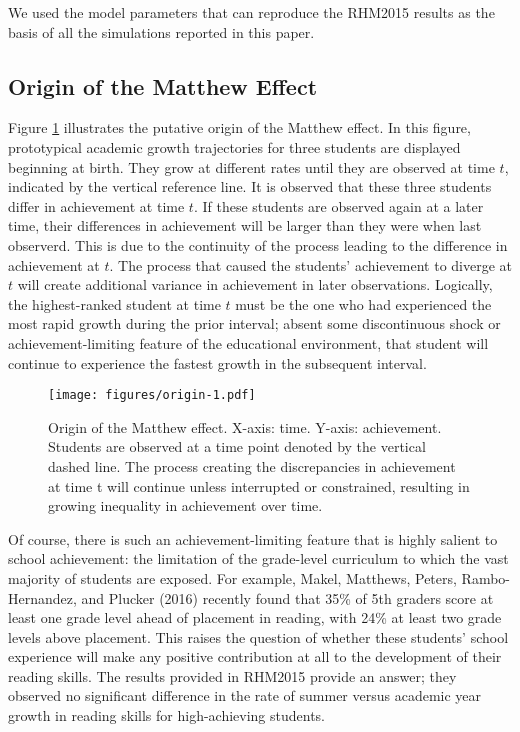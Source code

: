 \documentclass[english,floatsintext,jou]{apa6}
\theoremstyle{definition}
\theoremstyle{definition}
\theoremstyle{definition}
\theoremstyle{remark}
\begin{document}
We used the model parameters that can reproduce the RHM2015 results as
the basis of all the simulations reported in this paper.

\subsection{Origin of the Matthew
Effect}\label{origin-of-the-matthew-effect}

Figure \ref{fig:origin} illustrates the putative origin of the Matthew
effect. In this figure, prototypical academic growth trajectories for
three students are displayed beginning at birth. They grow at different
rates until they are observed at time \(t\), indicated by the vertical
reference line. It is observed that these three students differ in
achievement at time \(t\). If these students are observed again at a
later time, their differences in achievement will be larger than they
were when last observerd. This is due to the continuity of the process
leading to the difference in achievement at \(t\). The process that
caused the students' achievement to diverge at \(t\) will create
additional variance in achievement in later observations. Logically, the
highest-ranked student at time \(t\) must be the one who had experienced
the most rapid growth during the prior interval; absent some
discontinuous shock or achievement-limiting feature of the educational
environment, that student will continue to experience the fastest growth
in the subsequent interval.

\begin{figure}[htbp]
\centering
\texttt{[image: figures/origin-1.pdf]}
\caption{\label{fig:origin}Origin of the Matthew effect. X-axis: time.
Y-axis: achievement. Students are observed at a time point denoted by
the vertical dashed line. The process creating the discrepancies in
achievement at time t will continue unless interrupted or constrained,
resulting in growing inequality in achievement over time.}
\end{figure}

Of course, there is such an achievement-limiting feature that is highly
salient to school achievement: the limitation of the grade-level
curriculum to which the vast majority of students are exposed. For
example, Makel, Matthews, Peters, Rambo-Hernandez, and Plucker (2016)
recently found that 35\% of 5th graders score at least one grade level
ahead of placement in reading, with 24\% at least two grade levels above
placement. This raises the question of whether these students' school
experience will make any positive contribution at all to the development
of their reading skills. The results provided in RHM2015 provide an
answer; they observed no significant difference in the rate of summer
versus academic year growth in reading skills for high-achieving
students.
\end{document}
